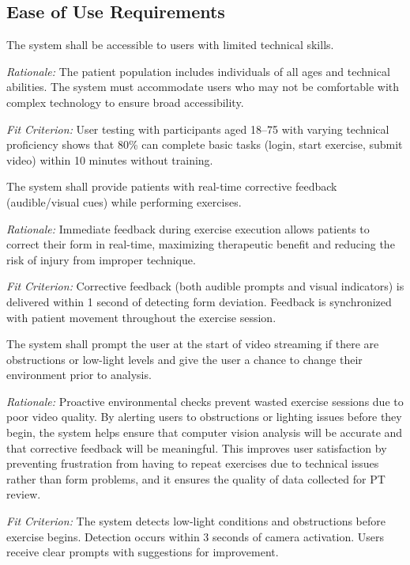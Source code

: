 \documentclass[12pt]{article}
\newcommand{\rationale}[1]{\par\emph{Rationale:} #1}
\newcommand{\fitcrit}[1]{\par\emph{Fit Criterion:} #1}
\begin{document}
\subsection{Ease of Use Requirements}
\begin{reqlist}
	\item[UHR-EOU 1.] The system shall be accessible to users with limited technical skills.
	\rationale{The patient population includes individuals of all ages and technical abilities. The system must accommodate users who may not be comfortable with complex technology to ensure broad accessibility.}
	\fitcrit{User testing with participants aged 18--75 with varying technical proficiency shows that 80\% can complete basic tasks (login, start exercise, submit video) within 10 minutes without training.}
	
	\item[UHR-EOU 2.] The system shall provide patients with real-time corrective feedback (audible/visual cues) while performing exercises.
	\rationale{Immediate feedback during exercise execution allows patients to correct their form in real-time, maximizing therapeutic benefit and reducing the risk of injury from improper technique.}
	\fitcrit{Corrective feedback (both audible prompts and visual indicators) is delivered within 1 second of detecting form deviation. Feedback is synchronized with patient movement throughout the exercise session.}
	
	\item[UHR-EOU 3.] The system shall prompt the user at the start of video streaming if there are obstructions or low-light levels and give the user a chance to change their environment prior to analysis.
	\rationale{Proactive environmental checks prevent wasted exercise sessions due to poor video quality. By alerting users to obstructions or lighting issues before they begin, the system helps ensure that computer vision analysis will be accurate and that corrective feedback will be meaningful. This improves user satisfaction by preventing frustration from having to repeat exercises due to technical issues rather than form problems, and it ensures the quality of data collected for PT review.}
	\fitcrit{The system detects low-light conditions and obstructions before exercise begins. Detection occurs within 3 seconds of camera activation. Users receive clear prompts with suggestions for improvement.}
	

\end{reqlist}
\end{document}
